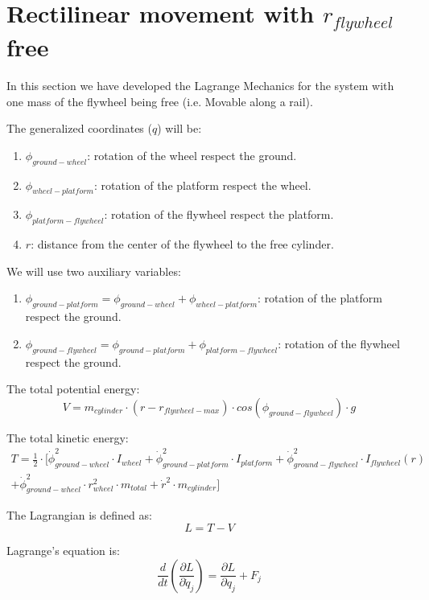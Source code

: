 \section{Rectilinear movement with $r_{flywheel}$ free}
In this section we have developed the Lagrange Mechanics for the system with
one mass of the flywheel being free (i.e. Movable along a rail).

The generalized coordinates ($q$) will be:
\begin{enumerate}
	\item $\phi_{ground-wheel}$: rotation of the wheel respect the ground.
	\item $\phi_{wheel-platform}$: rotation of the platform respect the wheel.
	\item $\phi_{platform-flywheel}$: rotation of the flywheel respect the platform.
	\item $r$: distance from the center of the flywheel to the free cylinder.
\end{enumerate}

We will use two auxiliary variables:
\begin{enumerate}
	\item $\phi_{ground-platform}=\phi_{ground-wheel}+\phi_{wheel-platform}$: rotation of the platform respect the ground.
	\item $\phi_{ground-flywheel}=\phi_{ground-platform}+\phi_{platform-flywheel}$: rotation of the flywheel respect the ground.
\end{enumerate}

The total potential energy:
\begin{equation}
	V = m_{cylinder}\cdot (r-r_{flywheel-max}) \cdot cos(\phi_{ground-flywheel}) \cdot g
\end{equation}

The total kinetic energy:
\begin{multline}
	T = \frac{1}{2}\cdot[\dot{\phi}_{ground-wheel}^2\cdot I_{wheel}
		+ \dot{\phi}_{ground-platform}^2 \cdot I_{platform}
		+ \dot{\phi}_{ground-flywheel}^2\cdot I_{flywheel}(r)\\
		+ \dot{\phi}_{ground-wheel}^2\cdot r_{wheel}^2\cdot m_{total}
		+ \dot{r}^2\cdot m_{cylinder}]
\end{multline}

The Lagrangian is defined as:
\begin{equation}
	L=T-V
\end{equation}

Lagrange's equation is:
\begin{equation}
	\frac{d}{dt}(\frac{\partial L}{\partial \dot{q}_j})=
	\frac{\partial L}{\partial q_j}	+ F_{j}
\end{equation}

